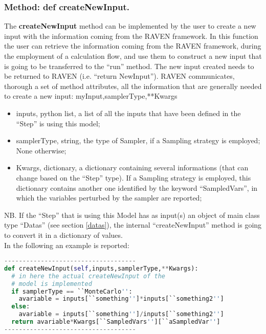 \subsubsection{Method: def createNewInput.}
\label{subsubsec:externalcreateNewInput}
The \textbf{createNewInput} method can be implemented by the user to create a new input with the information coming from the RAVEN framework. In this function the user can retrieve the information coming from the RAVEN framework, during the employment of a calculation flow, and use them to construct a new input that is going to be transferred to the ``run'' method.
The new input created needs to be returned to RAVEN (i.e. ``return NewInput'').
RAVEN communicates, thorough a set of method attributes, all the information that are generally needed to create a new input:
myInput,samplerType,**Kwargs
\begin{itemize}
\item inputs, python list, a list of all the inputs that have been defined in the ``Step'' is using this model;
\item samplerType, string, the type of Sampler, if a Sampling strategy is employed; None otherwise;
\item Kwargs, dictionary, a dictionary containing several informations (that can change based on the ``Step'' type). If a Sampling strategy is employed, this dictionary contains another one identified by the keyword ``SampledVars'', in which the variables perturbed by the sampler are reported;
\end{itemize}
NB. If the ``Step'' that is using this Model has as input(s) an object of main class type ``Datas'' (see section \ref{datas}), the internal ``createNewInput'' method is going to convert it in a dictionary of values.
\\In the following an example is reported:
\begin{lstlisting}[language=python]
------------------------------------
def createNewInput(self,inputs,samplerType,**Kwargs):
  # in here the actual createNewInput of the 
  # model is implemented
  if samplerType == ``MonteCarlo'':
    avariable = inputs[``something'']*inputs[``something2'']
  else:
    avariable = inputs[``something'']/inputs[``something2'']
  return avariable*Kwargs[``SampledVars''][``aSampledVar'']
------------------------------------
\end{lstlisting} 
